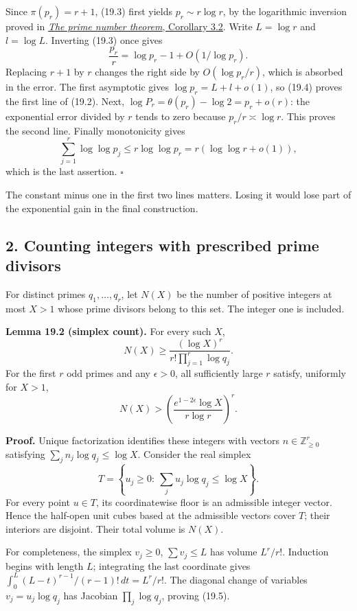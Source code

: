 \documentclass[
  11pt,
  a4paper,
]{article}
\begin{document}
Since \(\pi(p_r)=r+1\), (19.3) first yields \(p_r\sim r\log r\), by the
logarithmic inversion proved in
\href{https://kokunoyumeto.github.io/open-math-courses-public/courses/NT-ZETA/NT-ZETA-09.html}{\emph{The prime number theorem},
Corollary 3.2}. Write \(L=\log r\) and \(l=\log L\). Inverting (19.3)
once gives \[
 \frac{p_r}{r}=\log p_r-1+O(1/\log p_r).
 \tag{19.4}
\] Replacing \(r+1\) by \(r\) changes the right side by
\(O(\log p_r/r)\), which is absorbed in the error. The first asymptotic
gives \(\log p_r=L+l+o(1)\), so (19.4) proves the first line of (19.2).
Next, \(\log P_r=\theta(p_r)-\log2=p_r+o(r)\): the exponential error
divided by \(r\) tends to zero because \(p_r/r\asymp\log r\). This
proves the second line. Finally monotonicity gives \[
 \sum_{j=1}^r\log\log p_j\le r\log\log p_r
       =r(\log\log r+o(1)),
\] which is the last assertion. \(\square\)

The constant minus one in the first two lines matters. Losing it would
lose part of the exponential gain in the final construction.

\subsection{2. Counting integers with prescribed prime
divisors}\label{counting-integers-with-prescribed-prime-divisors}

For distinct primes \(q_1,\ldots,q_r\), let \(N(X)\) be the number of
positive integers at most \(X>1\) whose prime divisors belong to this
set. The integer one is included.

\textbf{Lemma 19.2 (simplex count).} For every such \(X\), \[
 N(X)\ge\frac{(\log X)^r}{r!\prod_{j=1}^r\log q_j}.
 \tag{19.5}
\] For the first \(r\) odd primes and any \(\epsilon>0\), all
sufficiently large \(r\) satisfy, uniformly for \(X>1\), \[
 N(X)>\left(\frac{e^{1-2\epsilon}\log X}
                          {r\log r}\right)^r.
 \tag{19.6}
\]

\textbf{Proof.} Unique factorization identifies these integers with
vectors \(n\in\mathbb Z_{\ge0}^r\) satisfying
\(\sum_jn_j\log q_j\le\log X\). Consider the real simplex \[
 T=\left\{u_j\ge0:\ \sum_ju_j\log q_j\le\log X\right\}.
 \tag{19.7}
\] For every point \(u\in T\), its coordinatewise floor is an admissible
integer vector. Hence the half-open unit cubes based at the admissible
vectors cover \(T\); their interiors are disjoint. Their total volume is
\(N(X)\).

For completeness, the simplex \(v_j\ge0\), \(\sum v_j\le L\) has volume
\(L^r/r!\). Induction begins with length \(L\); integrating the last
coordinate gives \(\int_0^L(L-t)^{r-1}/(r-1)!\,dt=L^r/r!\). The diagonal
change of variables \(v_j=u_j\log q_j\) has Jacobian
\(\prod_j\log q_j\), proving (19.5).
\end{document}
